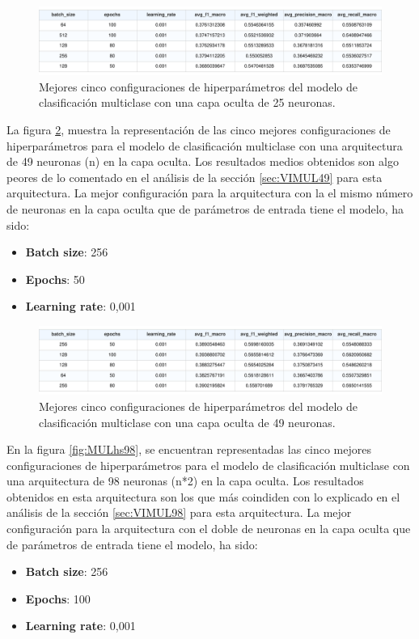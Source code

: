 \begin{figure}[H]
    \centering
    \includegraphics[width=1\textwidth]{./img/modelo/MULhs25.pdf}
    \caption{Mejores cinco configuraciones de hiperparámetros del modelo de clasificación multiclase con una capa oculta de 25 neuronas.}
    \label{fig:MULhs25}
\end{figure}



La figura \ref{fig:MULhs49}, muestra la representación de las cinco mejores configuraciones de hiperparámetros para el modelo de clasificación multiclase con una arquitectura de 49 neuronas (n) en la capa oculta. Los resultados medios obtenidos son algo peores de lo comentado en el análisis de la sección \ref{sec:VIMUL49} para esta arquitectura. La mejor configuración para la arquitectura con la el mismo número de neuronas en la capa oculta que de parámetros de entrada tiene el modelo, ha sido:
\begin{itemize}
	\item \textbf{Batch size}: 256
	\item \textbf{Epochs}: 50
	\item \textbf{Learning rate}: 0,001
\end{itemize}

\begin{figure}[H]
    \centering
    \includegraphics[width=1\textwidth]{./img/modelo/MULhs49.pdf}
    \caption{Mejores cinco configuraciones de hiperparámetros del modelo de clasificación multiclase con una capa oculta de 49 neuronas.}
    \label{fig:MULhs49}
\end{figure}


En la figura \ref{fig:MULhs98}, se encuentran representadas las cinco mejores configuraciones de hiperparámetros para el modelo de clasificación multiclase con una arquitectura de 98 neuronas (n*2) en la capa oculta. Los resultados obtenidos en esta arquitectura son los que más coindiden con lo explicado en el análisis de la sección \ref{sec:VIMUL98} para esta arquitectura. La mejor configuración para la arquitectura con el doble de neuronas en la capa oculta que de parámetros de entrada tiene el modelo, ha sido:
\begin{itemize}
	\item \textbf{Batch size}: 256
	\item \textbf{Epochs}: 100
	\item \textbf{Learning rate}: 0,001
\end{itemize}


